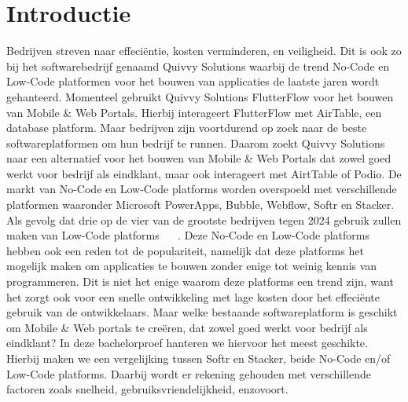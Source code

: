 
\section{Introductie}%
\label{sec:introductie}

Bedrijven streven naar effeciëntie, kosten  verminderen, en veiligheid. Dit is ook zo bij het softwarebedrijf genaamd Quivvy Solutions waarbij de trend No-Code en Low-Code
platformen voor het bouwen van applicaties de laatste jaren wordt gehanteerd. Momenteel gebruikt Quivvy Solutions FlutterFlow voor het bouwen van Mobile \& Web Portals. 
Hierbij interageert FlutterFlow met AirTable, een database platform. Maar bedrijven zijn voortdurend op zoek naar de beste softwareplatformen om hun bedrijf te runnen.
Daarom zoekt Quivvy Solutions naar een alternatief voor het bouwen van Mobile \& Web Portals dat zowel goed werkt voor bedrijf als eindklant, maar ook interageert met AirtTable of Podio.
De markt van No-Code en Low-Code platforms worden overspoeld met verschillende platformen waaronder Microsoft PowerApps, Bubble, Webflow, Softr en Stacker.
Als gevolg dat drie op de vier van de grootste bedrijven tegen 2024 gebruik zullen maken van Low-Code platforms ~\autocite{Moskal_2021} ~\autocite{Kulkarni_2021}.
Deze No-Code en Low-Code platforms hebben ook een reden tot de populariteit, namelijk dat
deze platforms het mogelijk maken om applicaties te bouwen zonder enige tot weinig kennis van programmeren. Dit is niet het enige waarom deze platforms een trend zijn,
want het zorgt ook voor een snelle ontwikkeling met lage kosten door het effeciënte gebruik van de ontwikkelaars.
Maar welke bestaande softwareplatform is geschikt om Mobile \& Web portals te creëren, dat zowel goed werkt voor bedrijf als eindklant?
In deze bachelorproef hanteren we hiervoor het meest geschikte.
Hierbij maken we een vergelijking tussen Softr en Stacker, beide No-Code en/of Low-Code platforms. Daarbij wordt er rekening gehouden met verschillende 
factoren zoals snelheid, gebruiksvriendelijkheid, enzovoort.




